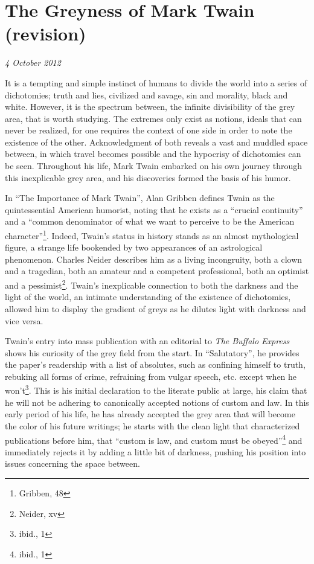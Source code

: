 \section{The Greyness of Mark Twain (revision)}

\textit{4 October 2012}

It is a tempting and simple instinct of humans to divide the world into a series
of dichotomies; truth and lies, civilized and savage, sin and morality, black
and white. However, it is the spectrum between, the infinite divisibility of the
grey area, that is worth studying. The extremes only exist as notions, ideals
that can never be realized, for one requires the context of one side in order to
note the existence of the other. Acknowledgment of both reveals a vast and
muddled space between, in which travel becomes possible and the hypocrisy of
dichotomies can be seen. Throughout his life, Mark Twain embarked on his own
journey through this inexplicable grey area, and his discoveries formed the
basis of his humor.

In ``The Importance of Mark Twain'', Alan Gribben defines Twain as the
quintessential American humorist, noting that he exists as a ``crucial
continuity'' and a ``common denominator of what we want to perceive to be the
American character''\footnote{Gribben, 48}. Indeed, Twain's status in history stands as
an almost mythological figure, a strange life bookended by two appearances of an
astrological phenomenon. Charles Neider describes him as a living incongruity,
both a clown and a tragedian, both an amateur and a competent professional, both
an optimist and a pessimist\footnote{Neider, xv}. Twain's inexplicable connection to both
the darkness and the light of the world, an intimate understanding of the
existence of dichotomies, allowed him to display the gradient of greys as he
dilutes light with darkness and vice versa.

Twain's entry into mass publication with an editorial to \textit{The Buffalo
Express} shows his curiosity of the grey field from the start. In
``Salutatory'', he provides the paper's readership with a list of absolutes,
such as confining himself to truth, rebuking all forms of crime, refraining from
vulgar speech, etc. except when he won't\footnote{ibid., 1}. This is his initial
declaration to the literate public at large, his claim that he will not be
adhering to canonically accepted notions of custom and  law. In this early
period of his life, he has already accepted the grey area that will become the
color of his future writings; he starts with the clean light that characterized
publications before him, that ``custom is law, and custom must be
obeyed''\footnote{ibid., 1} and immediately rejects it by adding a little bit of
darkness, pushing his position into issues concerning the space between.

